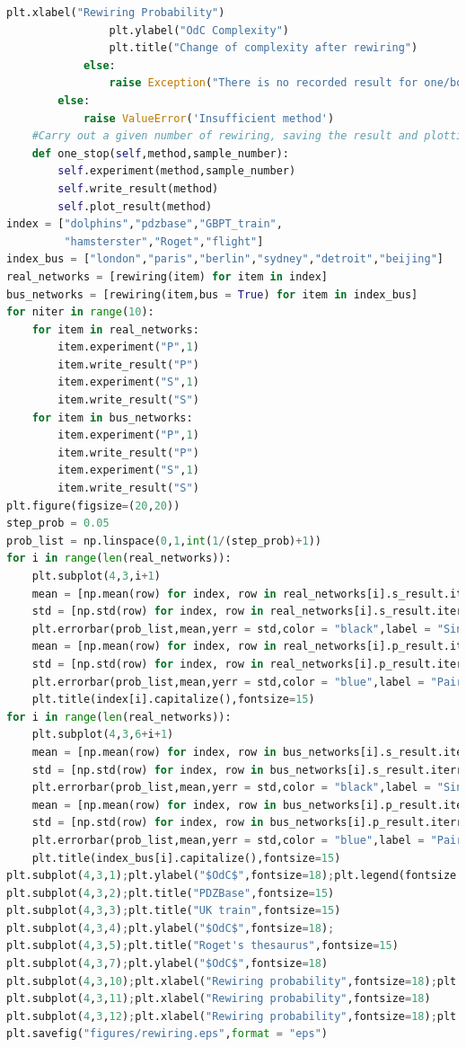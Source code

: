 \documentclass[12pt]{article}
\begin{document}
\begin{lstlisting}[breaklines=true,language=Python]
                plt.xlabel("Rewiring Probability")
                plt.ylabel("OdC Complexity")
                plt.title("Change of complexity after rewiring")
            else:
                raise Exception("There is no recorded result for one/both of the methods.")
        else:
            raise ValueError('Insufficient method')
    #Carry out a given number of rewiring, saving the result and plotting at the same time.
    def one_stop(self,method,sample_number):
        self.experiment(method,sample_number)
        self.write_result(method)
        self.plot_result(method)
index = ["dolphins","pdzbase","GBPT_train",
         "hamsterster","Roget","flight"]
index_bus = ["london","paris","berlin","sydney","detroit","beijing"]
real_networks = [rewiring(item) for item in index]
bus_networks = [rewiring(item,bus = True) for item in index_bus]
for niter in range(10):
    for item in real_networks:
        item.experiment("P",1)
        item.write_result("P")
        item.experiment("S",1)
        item.write_result("S")
    for item in bus_networks:
        item.experiment("P",1)
        item.write_result("P")
        item.experiment("S",1)
        item.write_result("S")
plt.figure(figsize=(20,20))
step_prob = 0.05
prob_list = np.linspace(0,1,int(1/(step_prob)+1))
for i in range(len(real_networks)):
    plt.subplot(4,3,i+1)
    mean = [np.mean(row) for index, row in real_networks[i].s_result.iterrows()]
    std = [np.std(row) for index, row in real_networks[i].s_result.iterrows()]
    plt.errorbar(prob_list,mean,yerr = std,color = "black",label = "Single link rewiring")
    mean = [np.mean(row) for index, row in real_networks[i].p_result.iterrows()]
    std = [np.std(row) for index, row in real_networks[i].p_result.iterrows()]
    plt.errorbar(prob_list,mean,yerr = std,color = "blue",label = "Pairwise rewiring")
    plt.title(index[i].capitalize(),fontsize=15)
for i in range(len(real_networks)):
    plt.subplot(4,3,6+i+1)
    mean = [np.mean(row) for index, row in bus_networks[i].s_result.iterrows()]
    std = [np.std(row) for index, row in bus_networks[i].s_result.iterrows()]
    plt.errorbar(prob_list,mean,yerr = std,color = "black",label = "Single link rewiring")
    mean = [np.mean(row) for index, row in bus_networks[i].p_result.iterrows()]
    std = [np.std(row) for index, row in bus_networks[i].p_result.iterrows()]
    plt.errorbar(prob_list,mean,yerr = std,color = "blue",label = "Pairwise rewiring")
    plt.title(index_bus[i].capitalize(),fontsize=15)
plt.subplot(4,3,1);plt.ylabel("$OdC$",fontsize=18);plt.legend(fontsize = 12);plt.title("Dolphins",fontsize=15)
plt.subplot(4,3,2);plt.title("PDZBase",fontsize=15)
plt.subplot(4,3,3);plt.title("UK train",fontsize=15)
plt.subplot(4,3,4);plt.ylabel("$OdC$",fontsize=18);
plt.subplot(4,3,5);plt.title("Roget's thesaurus",fontsize=15)
plt.subplot(4,3,7);plt.ylabel("$OdC$",fontsize=18)
plt.subplot(4,3,10);plt.xlabel("Rewiring probability",fontsize=18);plt.ylabel("$OdC$",fontsize=18)
plt.subplot(4,3,11);plt.xlabel("Rewiring probability",fontsize=18)
plt.subplot(4,3,12);plt.xlabel("Rewiring probability",fontsize=18);plt.legend(fontsize = 12)
plt.savefig("figures/rewiring.eps",format = "eps")
\end{lstlisting}
\end{document}
